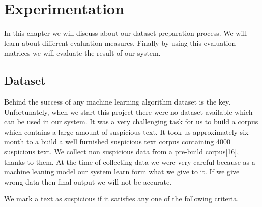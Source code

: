 \chapter{Experimentation}
\thispagestyle{empty}
In this chapter we will discuss about our dataset preparation process. We will learn about different evaluation measures. Finally by using this evaluation matrices we will evaluate the result of our system.

\section{Dataset}
Behind the success of any machine learning algorithm dataset is the key. Unfortunately, when we start this project there were no dataset available which can be used in our system. It was a very challenging task for us to build a corpus which contains a large amount of suspicious text. It took us approximately  six month to a build a well furnished  suspicious text corpus containing 4000 suspicious text. We collect non suspicious data from a pre-build corpus[16], thanks to them. At the time of collecting data we were very careful because as a machine leaning model our system learn form what we give to it. If we give wrong data then final output we will not be accurate. \par \vspace{0.5cm}\noindent 
We mark a text as suspicious if it satisfies any one of the following criteria.

